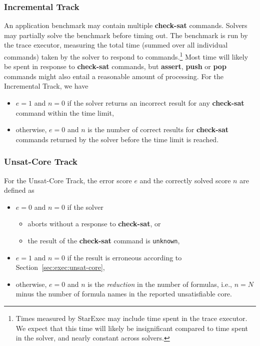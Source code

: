 \documentclass[12pt]{article}
\newcommand{\akey}[1]{\textbf{#1}\xspace}
\newcommand{\inctrack}{Incremental Track\xspace}
\newcommand{\ucoretrack}{Unsat-Core Track\xspace}
\begin{document}
\subsubsection{\inctrack}
%
An application benchmark may contain multiple \akey{check-sat}
commands.  Solvers may partially solve the benchmark before timing
out.  The benchmark is run by the trace executor, measuring the total
time (summed over all individual commands) taken by the solver to
respond to commands.\footnote{Times measured by StarExec may include
  time spent in the trace executor.  We expect that this time will
  likely be insignificant compared to time spent in the solver, and
  nearly constant across solvers.}  Most time will likely be spent in
response to \akey{check-sat} commands, but \akey{assert}, \akey{push}
or \akey{pop} commands might also entail a reasonable amount of
processing.  For the \inctrack, we have
\begin{itemize}
\item $e=1$ and $n=0$ if the solver returns an incorrect result for any
  \akey{check-sat} command within the time limit,
\item otherwise, $e=0$ and $n$ is the number of correct results for
  \akey{check-sat} commands returned by the solver before the time
  limit is reached.
\end{itemize}

\subsubsection{\ucoretrack}
  For the \ucoretrack, the error score $e$ and the correctly solved score $n$
  are defined as
  \begin{itemize}
  \item $e=0$ and $n=0$ if the solver
    \begin{itemize}[noitemsep,nolistsep]
      \item aborts without a response to \akey{check-sat}, or
      \item the result of the \akey{check-sat} command is \texttt{unknown},
    \end{itemize}
  \item $e=1$ and  $n=0$ if the result is erroneous according to
    Section~\ref{sec:exec:unsat-core},
  \item otherwise, $e=0$ and $n$ is the \emph{reduction} in the number of
    formulas, i.e., $n = N$ minus the number of formula names in the
    reported unsatisfiable core.
  \end{itemize}
\end{document}
